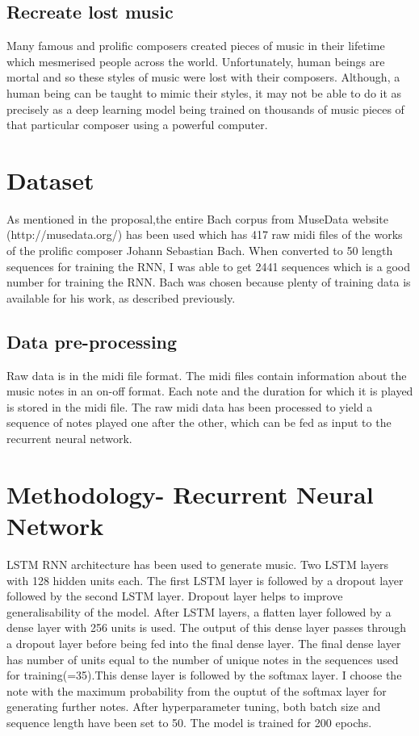 \documentclass[conference]{IEEEtran}
\begin{document}
\subsection{Recreate lost music}
Many famous and prolific composers created pieces of music in their lifetime which mesmerised people across the world. Unfortunately, human beings are mortal and so these styles of music were lost with their composers. Although, a human being can be taught to mimic their styles, it may not be able to do it as precisely as a deep learning model being trained on thousands of music pieces of that particular composer using a powerful computer.
\section{Dataset}
As mentioned in the proposal,the entire Bach corpus from MuseData website (http://musedata.org/) has been used which has 417 raw midi files of the works of the prolific composer Johann Sebastian Bach. When converted to 50 length sequences for training the RNN, I was able to get 2441 sequences which is a good number for training the RNN. Bach was chosen because plenty of training data is available for his work, as described previously.
\subsection{Data pre-processing}
Raw data is in the midi file format. The midi files contain information about the music notes in an on-off format. Each note and the duration for which it is played is stored in the midi file. The raw midi data has been processed to yield a sequence of notes played one after the other, which can be fed as input to the recurrent neural network.

\section{Methodology- Recurrent Neural Network}
LSTM RNN architecture has been used to generate music. Two LSTM layers with 128 hidden units each. The first LSTM layer is followed by a dropout layer followed by the second LSTM layer. Dropout layer helps to improve generalisability of the model.  After LSTM layers, a flatten layer followed by a dense layer with 256 units is used. The output of this dense layer passes through a dropout layer before being fed into the final dense layer. The final dense layer has number of units equal to the number of unique notes in the sequences used for training(=35).This dense layer is followed by the softmax layer. I choose the note with the maximum probability from the ouptut of the softmax layer for generating further notes. After hyperparameter tuning, both batch size and sequence length have been set to 50. The model is trained for 200 epochs.
\end{document}
